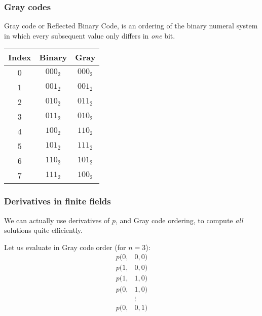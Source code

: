 \documentclass{beamer}
\begin{document}
\begin{frame}
    \frametitle{Gray codes}
    Gray code or Reflected Binary Code, is an ordering of the binary numeral system in which every subsequent value only differs in \textit{one} bit.

    \begin{center}
        \begin{tabular}{||c|c|c||}
            \hline
            Index & Binary & Gray \\
            \hline
            0 & $000_2$ & $000_2$\\
            1 & $001_2$ & $001_2$\\
            2 & $010_2$ & $011_2$\\
            3 & $011_2$ & $010_2$\\
            4 & $100_2$ & $110_2$\\
            5 & $101_2$ & $111_2$\\
            6 & $110_2$ & $101_2$\\
            7 & $111_2$ & $100_2$\\
            \hline
        \end{tabular}
    \end{center}
\end{frame}

\begin{frame}
    \frametitle{Derivatives in finite fields}
    We can actually use derivatives of $p$, and Gray code ordering, to compute \textit{all} solutions quite efficiently.
    
    \pause 

    Let us evaluate in Gray code order (for $n = 3$):
    \begin{equation*}
        \begin{split}
            p(0,&0,0)\\
            p(1,&0,0)\\
            p(1,&1,0)\\
            p(0,&1,0)\\
            &\vdots\\
            p(0,&0,1)
        \end{split}
    \end{equation*}
\end{frame}
\end{document}
